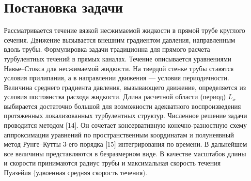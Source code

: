 
\chapter{Постановка задачи} 

Рассматривается течение вязкой несжимаемой жидкости в прямой трубе круглого сечения. Движение вызывается внешним градиентом давления, направленным вдоль трубы. Формулировка задачи традиционна для прямого расчета турбулентных течений в прямых каналах. Течение описывается уравнениями Навье--Стокса для несжимаемой жидкости. На твердой стенке трубы ставятся условия прилипания, а в направлении движения --- условия периодичности. Величина среднего градиента давления, вызывающего движение, определяется из условия постоянства расхода жидкости. Длина расчетной области (период) $L_x$ выбирается достаточно большой для возможности адекватного воспроизведения протяженных локализованных турбулентных структур. Численное решение задачи проводится методом [14]. Он сочетает консервативную конечно-разностную схему аппроксимации уравнений по пространственным координатам и полунеявный метод Рунге--Кутты 3-его порядка [15] интегрирования по времени. В дальнейшем все величины представляются в безразмерном виде. В качестве масштабов длины и скорости принимаются радиус трубы и максимальная скорость течения Пуазейля (удвоенная средняя скорость течения). 



